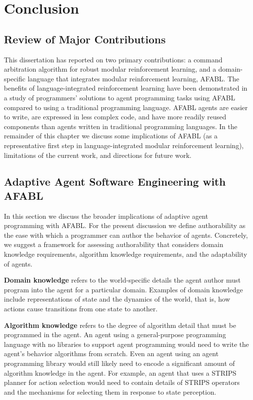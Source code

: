 \chapter{Conclusion}\label{ch:conclusion}

\section{Review of Major Contributions}

This dissertation has reported on two primary contributions: a command arbitration algorithm for robust modular reinforcement learning, and a domain-specific language that integrates modular reinforcement learning, AFABL. The benefits of language-integrated reinforcement learning have been demonstrated in a study of programmers' solutions to agent programming tasks using AFABL compared to using a traditional programming language. AFABL agents are easier to write, are expressed in less complex code, and have more readily reused components than agents written in traditional programming languages. In the remainder of this chapter we discuss some implications of AFABL (as a representative first step in language-integrated modular reinforcement learning), limitations of the current work, and directions for future work.

\section{Adaptive Agent Software Engineering with AFABL}

In this section we discuss the broader implications of adaptive agent programming with AFABL. For the present discussion we define authorability as the ease with which a programmer can author the behavior of agents.  Concretely, we suggest a framework for assessing authorability that considers domain knowledge requirements, algorithm knowledge requirements, and the adaptability of agents.

{\bf Domain knowledge} refers to the world-specific details the agent author must program into the agent for a particular domain.  Examples of domain knowledge include representations of state and the dynamics of the world, that is, how actions cause transitions from one state to another.

{\bf Algorithm knowledge} refers to the degree of algorithm detail that must be programmed in the agent.  An agent using a general-purpose programming language with no libraries to support agent programming would need to write the agent's behavior algorithms from scratch. Even an agent using an agent programming library would still likely need to encode a significant amount of algorithm knowledge in the agent. For example, an agent that uses a STRIPS planner for action selection would need to contain details of STRIPS operators and the mechanisms for selecting them in response to state perception.

